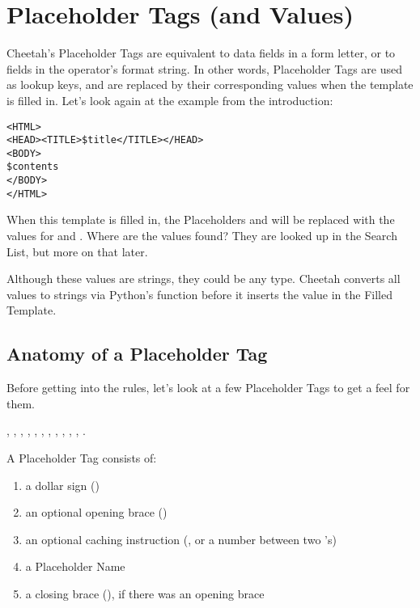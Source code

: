 \section{Placeholder Tags (and Values)}

Cheetah's Placeholder Tags are equivalent to data fields in a form letter, or to
 fields in the \code{\%} operator's format string.
In other words, Placeholder Tags are used as lookup keys, and are replaced by
their corresponding values when the template is filled in.
Let's look again at the example from the introduction:

\begin{verbatim}
<HTML>
<HEAD><TITLE>$title</TITLE></HEAD>
<BODY>
$contents
</BODY>
</HTML>
\end{verbatim}

When this template is filled in, the Placeholders  and
 will be replaced with the values for 
and .  Where are the values found?  They are looked up in the
Search List, but more on that later.

Although these values are strings, they could be any type.  Cheetah
converts all values to strings via Python's  function before it
inserts the value in the Filled Template.


\subsection{Anatomy of a Placeholder Tag}

Before getting into the rules, let's look at a few Placeholder Tags to get a
feel for them.

, \code{\$\_}, , , ,
, , , ,
,
,
.


A Placeholder Tag consists of: 

\begin{enumerate}
\item  a dollar sign (\code{\$})
\item  an optional opening brace (\code{\{})
\item  an optional caching instruction (\code{*}, or a number between two 
     \code{*}'s)
\item  a Placeholder Name
\item  a closing brace (\code{\}}), if there was an opening brace
\end{enumerate}

